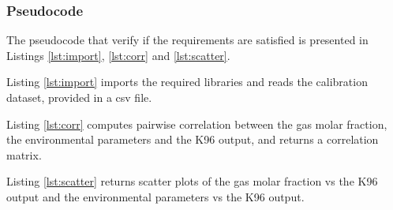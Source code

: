 \subsubsection*{Pseudocode}
The pseudocode that verify if the requirements are satisfied is presented in Listings \ref{lst:import}, \ref{lst:corr} and \ref{lst:scatter}.



Listing \ref{lst:import} imports the required libraries and reads the calibration dataset, provided in a csv file.



Listing \ref{lst:corr} computes pairwise correlation between the gas molar fraction, the environmental parameters and the K96 output, and returns a correlation matrix.



Listing \ref{lst:scatter} returns scatter plots of the gas molar fraction vs the K96 output and the environmental parameters vs the K96 output.